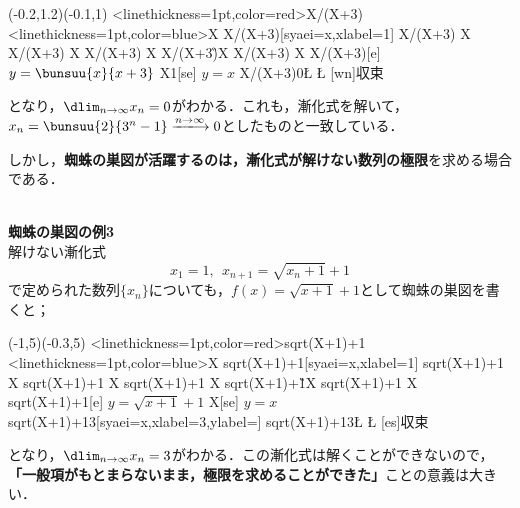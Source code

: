 \documentclass[10pt,
b5paper,
fleqn,
dvipdfmx,
uplatex
]{jsarticle}
\newcommand{\bb}{\bf\boldmath}%
\newcommand{\C}{\text{C}}
\begin{document}
\begin{center}
\begin{zahyou}[ul=50mm,gentenhaiti={[es]}](-0.2,1.2)(-0.1,1)
\def\Fx{X/(X+3)}
\def\Gx{X}
\YGraph<linethickness=1pt,color=red>\Fx
\YGraph<linethickness=1pt,color=blue>\Gx
\YPointPut\Fx{\aval}[syaei=x,xlabel=1]{}
\YPoint\Fx{\aval}\A
\YPoint\Gx{\bval}\B
\YPoint\Fx{\bval}\C
\YPoint\Gx{\cval}\D
\YPoint\Fx{\cval}\E
\YPoint\Gx{\dval}\F
\YPoint\Fx{\dval}\G
\YPoint\Gx{\eval}\I
\YPoint\Fx{\eval}\J
\YPoint\Gx{\fval}\K
{}
\Drawline{\A\B\C\D\E\F\G}
\YPointPut\Fx{\xmax}[e]{\color{red} $y=\bunsuu {x}{x+3}$}
\YPointPut\Gx{1}[se]{\color{blue} $y=x$}
\YPoint\Fx{0}\L
\KuromaruHankei{2pt}
\Kuromaru\L
\emathPut{\L}[wn]{収束}
\end{zahyou}
\end{center}
となり，$\dlim_{n\to\infty}x_n=0$がわかる．これも，漸化式を解いて，$x_n=\bunsuu{2}{3^n-1} \xlongrightarrow[]{n\to \infty} 0$としたものと一致している．

しかし，{\bb 蜘蛛の巣図が活躍するのは，漸化式が解けない数列の極限}を求める場合である．

\newpage

\ \\
{\bb\Large 蜘蛛の巣図の例3}\\

解けない漸化式
\[x_1=1,\ \ x_{n+1}=\sqrt{x_n+1}+1\]
で定められた数列$\{x_n\}$についても，$f(x)=\sqrt{x+1}+1$として蜘蛛の巣図を書くと；

\begin{center}
\begin{zahyou}[ul=10mm,gentenhaiti={[es]}](-1,5)(-0.3,5)
\def\Fx{sqrt(X+1)+1}
\def\Gx{X}
\YGraph<linethickness=1pt,color=red>\Fx
\YGraph<linethickness=1pt,color=blue>\Gx
\YPointPut\Fx{\aval}[syaei=x,xlabel=1]{}
\YPoint\Fx{\aval}\A
\YPoint\Gx{\bval}\B
\YPoint\Fx{\bval}\C
\YPoint\Gx{\cval}\D
\YPoint\Fx{\cval}\E
\YPoint\Gx{\dval}\F
\YPoint\Fx{\dval}\G
\YPoint\Gx{\eval}\I
\YPoint\Fx{\eval}\J
\YPoint\Gx{\fval}\K
{}
\Drawline{\A\B\C\D\E\F\G}
\YPointPut\Fx{\xmax}[e]{\color{red} $y=\sqrt{x+1}+1$}
\YPointPut\Gx{\xmax}[se]{\color{blue} $y=x$}
\YPointPut\Fx{3}[syaei=x,xlabel=3,ylabel=]{}
\YPoint\Fx{3}\L
\KuromaruHankei{2pt}
\Kuromaru\L
\emathPut{\L}[es]{収束}
\end{zahyou}
\end{center}
となり，$\dlim_{n\to\infty}x_n=3$がわかる．この漸化式は解くことができないので， {\bb 「一般項がもとまらないまま，極限を求めることができた」}ことの意義は大きい．
\end{document}
